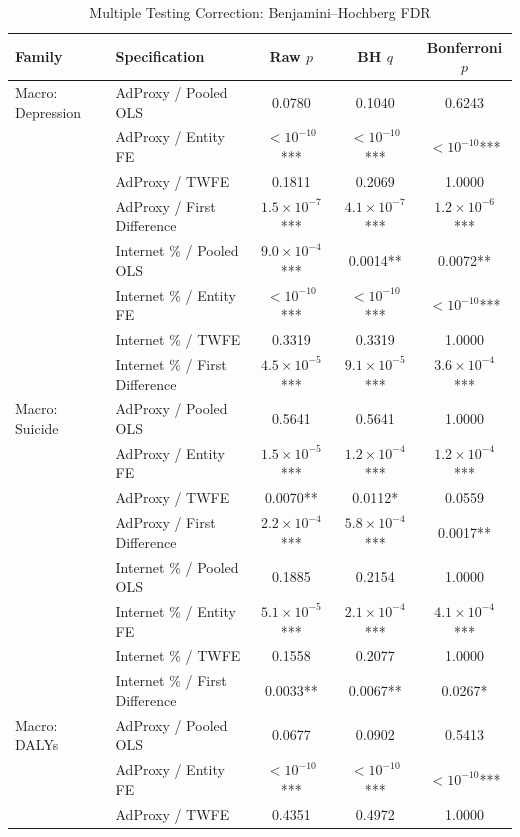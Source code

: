 \documentclass[a4paper,11pt,titlepage]{article}
\begin{document}
\begin{table}[htbp]
\centering
\caption{Multiple Testing Correction: Benjamini--Hochberg FDR}
\label{tab:fdr}
\footnotesize
\begin{tabular}{llccc}
\toprule
Family & Specification & Raw $p$ & BH $q$ & Bonferroni $p$ \\
\midrule
  Macro: Depression & AdProxy / Pooled OLS & 0.0780 & 0.1040 & 0.6243 \\
   & AdProxy / Entity FE & $< 10^{-10}$*** & $< 10^{-10}$*** & $< 10^{-10}$*** \\
   & AdProxy / TWFE & 0.1811 & 0.2069 & 1.0000 \\
   & AdProxy / First Difference & $1.5 \times 10^{-7}$*** & $4.1 \times 10^{-7}$*** & $1.2 \times 10^{-6}$*** \\
   & Internet \% / Pooled OLS & $9.0 \times 10^{-4}$*** & 0.0014** & 0.0072** \\
   & Internet \% / Entity FE & $< 10^{-10}$*** & $< 10^{-10}$*** & $< 10^{-10}$*** \\
   & Internet \% / TWFE & 0.3319 & 0.3319 & 1.0000 \\
   & Internet \% / First Difference & $4.5 \times 10^{-5}$*** & $9.1 \times 10^{-5}$*** & $3.6 \times 10^{-4}$*** \\
\addlinespace
  Macro: Suicide & AdProxy / Pooled OLS & 0.5641 & 0.5641 & 1.0000 \\
   & AdProxy / Entity FE & $1.5 \times 10^{-5}$*** & $1.2 \times 10^{-4}$*** & $1.2 \times 10^{-4}$*** \\
   & AdProxy / TWFE & 0.0070** & 0.0112* & 0.0559 \\
   & AdProxy / First Difference & $2.2 \times 10^{-4}$*** & $5.8 \times 10^{-4}$*** & 0.0017** \\
   & Internet \% / Pooled OLS & 0.1885 & 0.2154 & 1.0000 \\
   & Internet \% / Entity FE & $5.1 \times 10^{-5}$*** & $2.1 \times 10^{-4}$*** & $4.1 \times 10^{-4}$*** \\
   & Internet \% / TWFE & 0.1558 & 0.2077 & 1.0000 \\
   & Internet \% / First Difference & 0.0033** & 0.0067** & 0.0267* \\
\addlinespace
  Macro: DALYs & AdProxy / Pooled OLS & 0.0677 & 0.0902 & 0.5413 \\
   & AdProxy / Entity FE & $< 10^{-10}$*** & $< 10^{-10}$*** & $< 10^{-10}$*** \\
   & AdProxy / TWFE & 0.4351 & 0.4972 & 1.0000 \\

\end{tabular}
\end{table}
\end{document}
